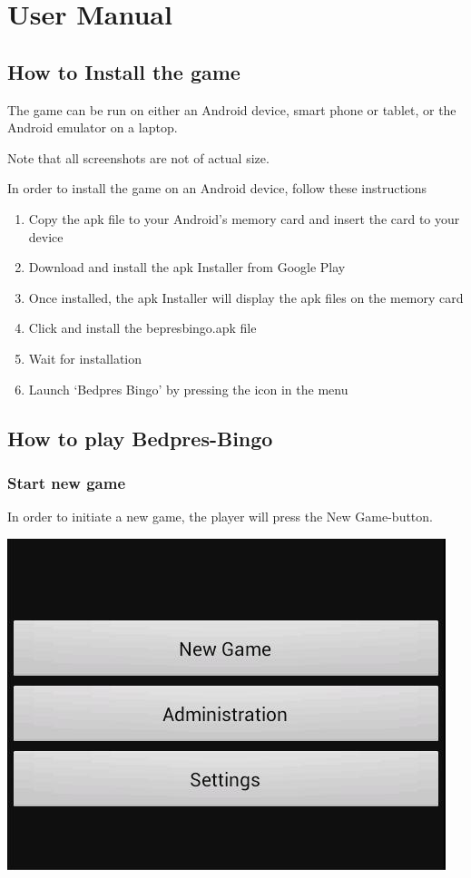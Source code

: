 \section{User Manual}
\label{usermanual}

\subsection{How to Install the game}
The game can be run on either an Android device, smart phone or tablet, or
the Android emulator on a laptop.

Note that all screenshots are not of actual size.

In order to install the game on an Android device, follow these instructions
\begin{enumerate}
\item Copy the apk file to your Android's memory card and insert the card to
your device
\item Download and install the apk Installer from Google Play\cite{website:apk}
\item Once installed, the apk Installer will display the apk files on the
memory card
\item Click and install the bepresbingo.apk file
\item Wait for installation 
\item Launch `Bedpres Bingo' by pressing the icon in the menu
\end{enumerate}

\subsection{How to play Bedpres-Bingo}

\subsubsection{Start new game}
In order to initiate a new game, the player will press the New Game-button.
\begin{center}
\includegraphics{Pikks/mainmenu}
\end{center}

